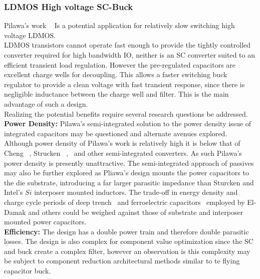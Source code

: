 \documentclass[letterpaper,twocolumn,10pt]{article}
\begin{document}
\subsubsection{LDMOS High voltage SC-Buck}
Pilawa's work ~\cite{Pilawa2012} Is a potential application for relatively slow switching high voltage LDMOS.\\
LDMOS transistors cannot operate fast enough to provide the tightly controlled converter required for high bandwidth IO, neither is an SC converter suited to an efficient transient load regulation. However the pre-regulated capacitors are excellent charge wells for decoupling. This allows a faster switching buck regulator to provide a clean voltage with fast transient response, since there is negligible inductance between the charge well and filter. This is the main advantage of such a design.\\
Realizing the potential benefits require several research questions be addressed.\\
\textbf{Power Density: }Pilawa's semi-integrated solution to the power density issue of integrated capacitors may be questioned and alternate avenues explored. Although power density of Pilawa's work is relatively high it is below that of Cheng ~\cite{Cheng2013}, Strucken ~\cite{Sturcken2012},~\cite{Sturcken2013} and other semi-integrated converters. As such Pilawa's power density is presently unattractive. The semi-integrated approach of passives may also be further explored as Pliawa's design mounts the power capacitors to the die substrate, introducing a far larger parasitic impedance than Sturcken and Intel's $Si$ interposer mounted inductors. The trade-off in energy density and charge cycle periods of deep trench~\cite{Andersen2013} and ferroelectric capacitors~\cite{Damak2013} employed by El-Damak and others could be weighed against those of substrate and interposer mounted power capacitors.\\   
\textbf{Efficiency: }The design has a double power train and therefore double parasitic losses. The design is also complex for component value optimization since the SC and buck create a complex filter, however an observation is this complexity may be subject to component reduction architectural methods similar to te flying capacitor buck.\\  
\end{document}
